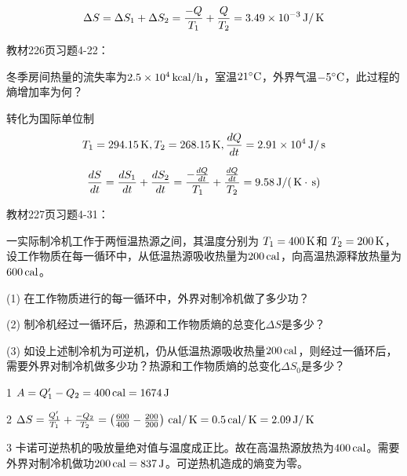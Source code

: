 \documentclass[CJK]{beamer}
\begin{document}
\begin{frame}
  \bch
  $$\Delta S =\Delta S_1 + \Delta S_2 =  \frac{-Q}{T_1} +\frac{Q}{T_2} = 3.49\times 10^{-3} \,\mathrm{J}/\,\mathrm{K}$$
  \ech
\end{frame}

\begin{frame}
  \chtitle{\proid (\sone)}
  \bch
  教材226页习题4-22：

  冬季房间热量的流失率为$2.5\times 10^4\,\mathrm{kcal}/\mathrm{h}$，室温$21^\circ \mathrm{C}$，外界气温$-5^\circ \mathrm{C}$，此过程的熵增加率为何？
  \ech
\end{frame}

\begin{frame}
  \bch
  转化为国际单位制
  $$T_1 = 294.15\,\mathrm{K}, T_2 = 268.15\,\mathrm{K}, \frac{dQ}{dt} = 2.91\times 10^4 \,\mathrm{J}/\,\mathrm{s}$$
  
  $$\frac{d S}{dt} = \frac{d S_1}{dt} + \frac{d S_2}{dt} = \frac{-\frac{dQ}{dt}}{T_1} +\frac{\frac{dQ}{dt}}{T_2} = 9.58 \,\mathrm{J}/(\,\mathrm{K}\cdot\,\mathrm{s})$$
  \ech
\end{frame}

\begin{frame}
  \chtitle{\proid (\stwo)}
  \bch
  教材227页习题4-31：

  一实际制冷机工作于两恒温热源之间，其温度分别为 $T_1= 400\,\mathrm{K}$和 $T_2 = 200\,\mathrm{K}$，设工作物质在每一循环中，从低温热源吸收热量为$200\,\mathrm{cal}$，向高温热源释放热量为$600\,\mathrm{cal}$。
  \bitem
\item[(1)]{在工作物质进行的每一循环中，外界对制冷机做了多少功？}
\item[(2)]{制冷机经过一循环后，热源和工作物质熵的总变化$\Delta S$是多少？}
\item[(3)]{如设上述制冷机为可逆机，仍从低温热源吸收热量$200\,\mathrm{cal}$，则经过一循环后，需要外界对制冷机做多少功？热源和工作物质熵的总变化$\Delta S_0$是多少？}
  \eitem
  
  \ech
\end{frame}


\begin{frame}
  \bch
  {\small
    \bitem
  \item[1]{$A = Q_1'-Q_2  = 400\,\mathrm{cal} = 1674\,\mathrm{J}$}
  \item[2]{$\Delta S = \frac{Q_1'}{T_1}+\frac{-Q_2}{T_2} = \left(\frac{600}{400}-\frac{200}{200}\right)\,\mathrm{cal}/\,\mathrm{K} = 0.5\,\mathrm{cal}/\,\mathrm{K} = 2.09\,\mathrm{J}/\,\mathrm{K}$}
  \item[3]{卡诺可逆热机的吸放量绝对值与温度成正比。故在高温热源放热为$400\,\mathrm{cal}$。需要外界对制冷机做功$200\,\mathrm{cal} = 837\,\mathrm{J}$。可逆热机造成的熵变为零。}
  \eitem
  }
  \ech
\end{frame}
\end{document}
